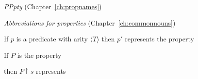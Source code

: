 
\textit{PPpty} (Chapter~\ref{ch:propnames})


\textit{Abbreviations for properties} (Chapter~\ref{ch:commonnouns}) 

If $p$ is a predicate with arity $\langle T\rangle$ then $p'$
represents the property

\begin{quote}
\end{quote}

\bigskip

If $P$ is the property\label{pg:property-restriction}

\begin{quote}
\end{quote}

then $P\!\restriction\!s$ represents

\begin{quote}
\end{quote}






